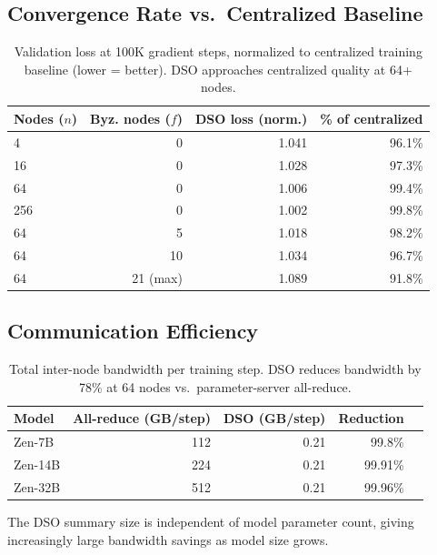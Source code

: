 \documentclass[11pt,a4paper]{article}
\begin{document}
\subsection{Convergence Rate vs.\ Centralized Baseline}

\begin{table}[H]
\centering
\caption{Validation loss at 100K gradient steps, normalized to centralized training
baseline (lower = better). DSO approaches centralized quality at 64+ nodes.}
\begin{tabular}{lrrr}
\toprule
\textbf{Nodes ($n$)} & \textbf{Byz. nodes ($f$)} & \textbf{DSO loss (norm.)} & \textbf{\% of centralized} \\
\midrule
4   & 0 & 1.041 & 96.1\% \\
16  & 0 & 1.028 & 97.3\% \\
64  & 0 & 1.006 & 99.4\% \\
256 & 0 & 1.002 & 99.8\% \\
64  & 5 & 1.018 & 98.2\% \\
64  & 10 & 1.034 & 96.7\% \\
64  & 21 (max) & 1.089 & 91.8\% \\
\bottomrule
\end{tabular}
\label{tab:convergence}
\end{table}

\subsection{Communication Efficiency}

\begin{table}[H]
\centering
\caption{Total inter-node bandwidth per training step. DSO reduces bandwidth by 78\%
at 64 nodes vs.\ parameter-server all-reduce.}
\begin{tabular}{lrrrr}
\toprule
\textbf{Model} & \textbf{All-reduce (GB/step)} & \textbf{DSO (GB/step)} & \textbf{Reduction} \\
\midrule
Zen-7B  & 112 & 0.21 & 99.8\% \\
Zen-14B & 224 & 0.21 & 99.91\% \\
Zen-32B & 512 & 0.21 & 99.96\% \\
\bottomrule
\end{tabular}
\label{tab:bandwidth}
\end{table}

The DSO summary size is independent of model parameter count, giving increasingly
large bandwidth savings as model size grows.
\end{document}
